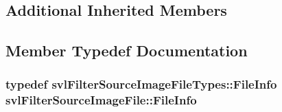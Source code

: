 \subsection*{Additional Inherited Members}


\subsection{Member Typedef Documentation}
\hypertarget{classsvl_filter_source_image_file_a0acade731f76b2a1adc5a6a43417c4f4}{
\subsubsection[{File\-Info}]{\setlength{\rightskip}{0pt plus 5cm}typedef {\bf svl\-Filter\-Source\-Image\-File\-Types\-::\-File\-Info} {\bf svl\-Filter\-Source\-Image\-File\-::\-File\-Info}}}\label{classsvl_filter_source_image_file_a0acade731f76b2a1adc5a6a43417c4f4}


